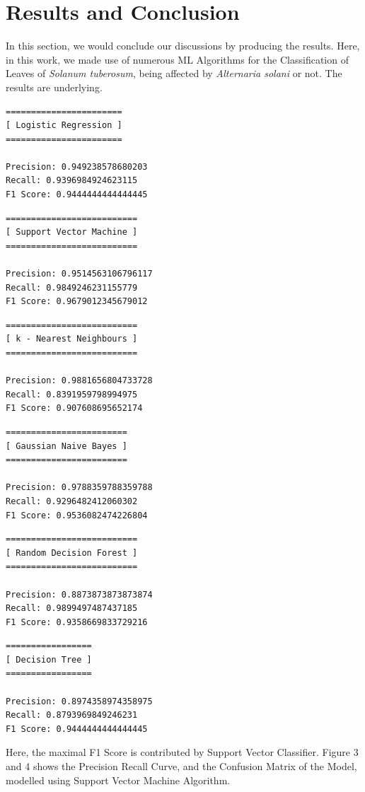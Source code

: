 \documentclass[conference]{IEEEtran}
\begin{document}
\section{Results and Conclusion}
In this section, we would conclude our discussions by producing the results. Here, in this work, we made use of numerous ML Algorithms for the Classification of Leaves of \textit{Solanum tuberosum}, being affected by \textit{Alternaria solani} or not. The results are underlying. 
\begin{verbatim}
=======================
[ Logistic Regression ]
=======================

Precision: 0.949238578680203
Recall: 0.9396984924623115
F1 Score: 0.9444444444444445
\end{verbatim}
\begin{verbatim}
==========================
[ Support Vector Machine ]
==========================

Precision: 0.9514563106796117
Recall: 0.9849246231155779
F1 Score: 0.9679012345679012
\end{verbatim}
\begin{verbatim}
==========================
[ k - Nearest Neighbours ]
==========================

Precision: 0.9881656804733728
Recall: 0.8391959798994975
F1 Score: 0.907608695652174
\end{verbatim}
\begin{verbatim}
========================
[ Gaussian Naive Bayes ]
========================

Precision: 0.9788359788359788
Recall: 0.9296482412060302
F1 Score: 0.9536082474226804
\end{verbatim}
\begin{verbatim}
==========================
[ Random Decision Forest ]
==========================

Precision: 0.8873873873873874
Recall: 0.9899497487437185
F1 Score: 0.9358669833729216
\end{verbatim}
\begin{verbatim}
=================
[ Decision Tree ]
=================

Precision: 0.8974358974358975
Recall: 0.8793969849246231
F1 Score: 0.9444444444444445
\end{verbatim}
Here, the maximal F1 Score is contributed by Support Vector Classifier. Figure 3 and 4 shows the Precision Recall Curve, and the Confusion Matrix of the Model, modelled using Support Vector Machine Algorithm. 
\end{document}
